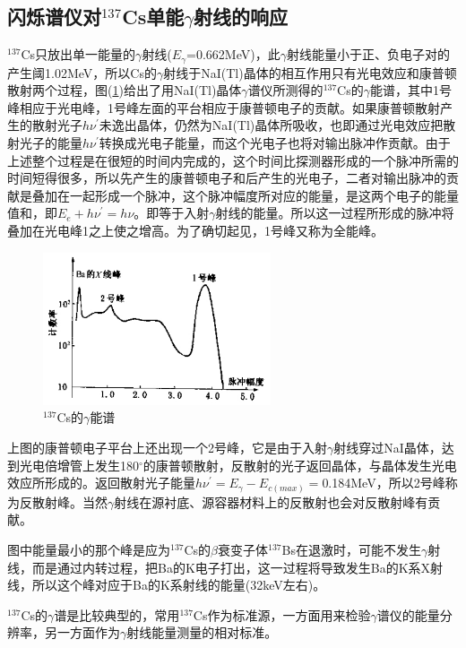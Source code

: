 \documentclass[a4paper]{article}
\begin{document}
\subsection{闪烁谱仪对$^{137}$Cs单能$\gamma$射线的响应}
$^{137}$Cs只放出单一能量的$\gamma$射线($E_{\gamma}$=0.662MeV)，此$\gamma$射线能量小于正、负电子对的产生阈1.02MeV，所以Cs的$\gamma$射线于NaI(Tl)晶体的相互作用只有光电效应和康普顿散射两个过程，图(\ref{fig6})给出了用NaI(Tl)晶体$\gamma$谱仪所测得的$^{137}$Cs的$\gamma$能谱，其中1号峰相应于光电峰，1号峰左面的平台相应于康普顿电子的贡献。如果康普顿散射产生的散射光子$h\nu^{'}$未逸出晶体，仍然为NaI(Tl)晶体所吸收，也即通过光电效应把散射光子的能量$h\nu^{'}$转换成光电子能量，而这个光电子也将对输出脉冲作贡献。由于上述整个过程是在很短的时间内完成的，这个时间比探测器形成的一个脉冲所需的时间短得很多，所以先产生的康普顿电子和后产生的光电子，二者对输出脉冲的贡献是叠加在一起形成一个脉冲，这个脉冲幅度所对应的能量，是这两个电子的能量值和，即$E_e + h\nu^{'} = h\nu$。即等于入射$\gamma$射线的能量。所以这一过程所形成的脉冲将叠加在光电峰1之上使之增高。为了确切起见，1号峰又称为全能峰。
\begin{figure}[!h]
	\centering
	\includegraphics[width=0.6\textwidth]{fig/fig6.pdf}
	\caption{$^{137}$Cs的$\gamma$能谱}\label{fig6}
\end{figure}

上图的康普顿电子平台上还出现一个2号峰，它是由于入射$\gamma$射线穿过NaI晶体，达到光电倍增管上发生180$^{\circ}$的康普顿散射，反散射的光子返回晶体，与晶体发生光电效应所形成的。返回散射光子能量$h\nu^{'} = E_{\gamma} - E_{c(max)} = $0.184MeV，所以2号峰称为反散射峰。当然$\gamma$射线在源衬底、源容器材料上的反散射也会对反散射峰有贡献。

图中能量最小的那个峰是应为$^{137}$Cs的$\beta$衰变子体$^{137}$Bs在退激时，可能不发生$\gamma$射线，而是通过内转过程，把Ba的K电子打出，这一过程将导致发生Ba的K系X射线，所以这个峰对应于Ba的K系射线的能量(32keV左右)。

$^{137}$Cs的$\gamma$谱是比较典型的，常用$^{137}$Cs作为标准源，一方面用来检验$\gamma$谱仪的能量分辨率，另一方面作为$\gamma$射线能量测量的相对标准。
\end{document}
